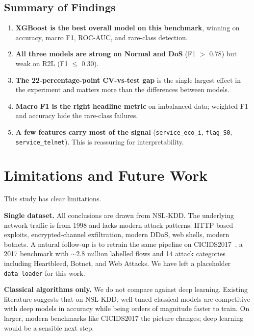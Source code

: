 \documentclass[11pt, a4paper]{article}
\begin{document}
\subsection{Summary of Findings}
\begin{enumerate}
    \item \textbf{XGBoost is the best overall model on this benchmark}, winning on accuracy, macro F1, ROC-AUC, and rare-class detection.
    \item \textbf{All three models are strong on Normal and DoS} (F1 $>$ 0.78) but weak on R2L (F1 $\leq$ 0.30).
    \item \textbf{The 22-percentage-point CV-vs-test gap} is the single largest effect in the experiment and matters more than the differences between models.
    \item \textbf{Macro F1 is the right headline metric} on imbalanced data; weighted F1 and accuracy hide the rare-class failures.
    \item \textbf{A few features carry most of the signal} (\texttt{service\_eco\_i}, \texttt{flag\_S0}, \texttt{service\_telnet}). This is reassuring for interpretability.
\end{enumerate}

\section{Limitations and Future Work}
\label{sec:limitations}

This study has clear limitations.

\textbf{Single dataset.} All conclusions are drawn from NSL-KDD. The underlying network traffic is from 1998 and lacks modern attack patterns: HTTP-based exploits, encrypted-channel exfiltration, modern DDoS, web shells, modern botnets. A natural follow-up is to retrain the same pipeline on CICIDS2017~\cite{panigrahi2018}, a 2017 benchmark with $\sim$2.8 million labelled flows and 14 attack categories including Heartbleed, Botnet, and Web Attacks. We have left a placeholder \texttt{data\_loader} for this work.

\textbf{Classical algorithms only.} We do not compare against deep learning. Existing literature suggests that on NSL-KDD, well-tuned classical models are competitive with deep models in accuracy while being orders of magnitude faster to train. On larger, modern benchmarks like CICIDS2017 the picture changes; deep learning would be a sensible next step.
\end{document}
